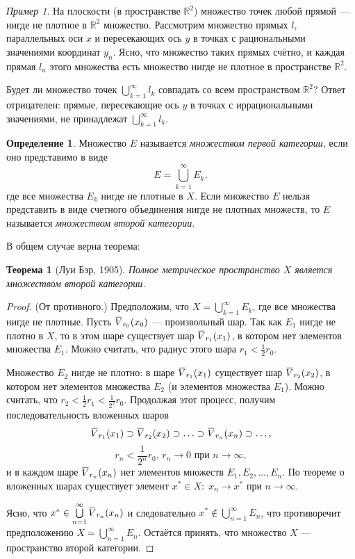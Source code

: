 \documentclass[12pt,a4paper,titlepage,oneside]{book}
\newcommand{\overbar}[1]{\mkern 1.5mu\overline{\mkern-1.5mu#1\mkern-1.5mu}\mkern 1.5mu}
\theoremstyle{definition}
\newtheorem*{definition}{Определение}
\theoremstyle{plain}
\newtheorem*{theorem}{Теорема}
\theoremstyle{break}
\theoremstyle{remark}
\theoremstyle{remark}
\newtheorem*{example}{Пример}
\theoremstyle{remark}
\theoremstyle{remark}
\theoremstyle{plain}
\theoremstyle{plain}
\begin{document}
\begin{example}
На плоскости (в пространстве $\mathbb{R}^2$) множество точек любой прямой --- нигде не плотное в $\mathbb{R}^2$ множество.
Рассмотрим множество прямых $l$, параллельных оси $x$ и пересекающих ось $y$ в точках с рациональными значениями координат $y_n$. Ясно, что множество таких прямых счётно, и каждая прямая $l_n$ этого множества есть множество нигде не плотное в пространстве $\mathbb{R}^2$.

Будет ли множество точек $\bigcup\limits_{k=1}^\infty l_k$ совпадать со всем пространством $\mathbb{R}^2$? Ответ отрицателен: прямые, пересекающие ось $y$ в точках с иррациональными значениями, не принадлежат $\bigcup\limits_{k=1}^\infty l_k$.
\end{example}

\begin{definition}
Множество $E$ называется \textit{множеством первой категории}, если оно представимо в виде 
$$E=\bigcup\limits_{k=1}^\infty E_k,$$ 
где все множества $E_k$ нигде не плотные в $X$. Если множество $E$ нельзя представить в виде счетного объединения нигде не плотных множеств, то $E$ называется \textit{множеством второй категории}.
\end{definition}

В общем случае верна теорема:

\begin{theorem}[Луи Бэр, 1905]
Полное метрическое пространство $X$ является множеством второй категории.
\end{theorem}

\begin{proof}
(От противного.) Предположим, что $X=\bigcup\limits_{k=1}^\infty E_k$, где все множества нигде не плотные. Пусть $\overbar{V}_{r_0}(x_0)$ --- произвольный шар. Так как $E_1$ нигде не плотно в $X$, то в этом шаре существует шар $\overbar{V}_{r_1}(x_1)$, в котором нет элементов множества $E_1$. Можно считать, что радиус этого шара $r_1 < \frac{1}{2}r_0$.

Множество $E_2$ нигде не плотно: в шаре $\overbar{V}_{r_1}(x_1)$ существует шар $\overbar{V}_{r_2}(x_2)$, в котором нет элементов множества $E_2$ (и элементов множества $E_1$). Можно считать, что $r_2 < \frac{1}{2}r_1 < \frac{1}{2^2}r_0$.
Продолжая этот процесс, получим последовательность вложенных шаров 
$$\overbar{V}_{r_1}(x_1) \supset \overbar{V}_{r_2}(x_2) \supset \ldots \supset \overbar{V}_{r_n}(x_n) \supset \ldots,$$
$$r_n < \frac{1}{2^n}r_0 \mbox{, } r_n \to 0 \mbox{ при } n \to \infty,$$
и в каждом шаре $\overbar{V}_{r_n}(x_n)$ нет элементов множеств $E_1, E_2, \ldots, E_n$.
По теореме о вложенных шарах существует элемент $x^* \in X: \; x_n \to x^*$ при $n \to \infty$.

Ясно, что $x^*\in \bigcup\limits_{n=1}^\infty \overbar{V}_{r_n}(x_n)$ и следовательно $x^*\notin \bigcup\limits_{n=1}^\infty E_n$, что противоречит предположению $X=\bigcup\limits_{n=1}^\infty E_n$. Остаётся принять, что множество $X$ --- пространство второй категории.
\end{proof}
\end{document}
